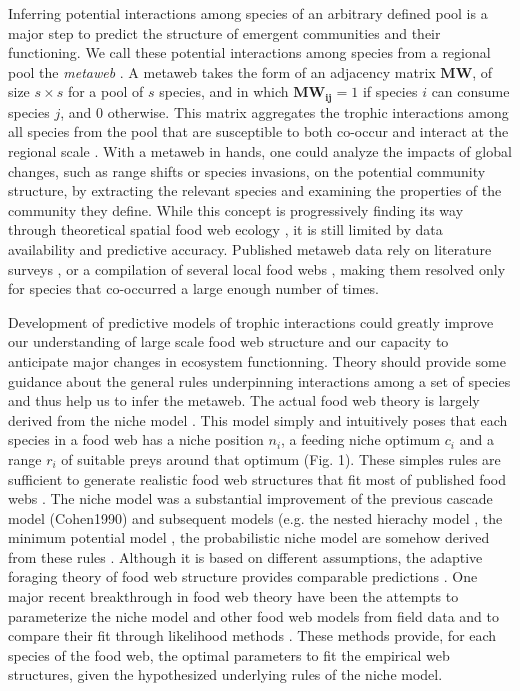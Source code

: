 \documentclass[12pt]{article}
\begin{document}
Inferring potential interactions among species of an arbitrary defined pool is a major step to predict the structure of emergent communities and their functioning. We call these potential interactions among species from a regional pool the \emph{metaweb} \parencite{Dunne2006}. A metaweb takes the form of an adjacency matrix $\mathbf{MW}$, of size $s\times s$ for a pool of $s$ species, and in which $\mathbf{MW_{ij}} = 1$ if species $i$ can consume species $j$, and $0$ otherwise. This matrix aggregates the trophic interactions among all species from the pool that are susceptible to both co-occur and interact at the regional scale \parencite{Dunne2006}. With a metaweb in hands, one could analyze the impacts of global changes, such as range shifts or species invasions, on the potential community structure, by extracting the relevant species and examining the properties of the community they define. While this concept is progressively finding its way through theoretical spatial food web ecology \parencite{Lafferty2010, Pillai2009, Gravel2011a, Gravel2011b}, it is still limited by data availability and predictive accuracy. Published metaweb data rely on literature surveys \parencite{Havens1992, Piechnik2008, Baiser2012}, or a compilation of several local food webs \parencite{Stanko2002, Poisot2012a}, making them resolved only for species that co-occurred a large enough number of times. 

Development of predictive models of trophic interactions could greatly improve our understanding of large scale food web structure and our capacity to anticipate major changes in ecosystem functionning. Theory should provide some guidance about the general rules underpinning interactions among a set of species and thus help us to infer the metaweb. The actual food web theory is largely derived from the niche model \parencite{Williams2000}. This model simply and intuitively poses that each species in a food web has a niche position $n_i$, a feeding niche optimum $c_i$ and a range $r_i$ of suitable preys around that optimum (Fig. 1). These simples rules are sufficient to generate realistic food web structures that fit most of published food webs \parencite{Dunne2006}. The niche model was a substantial improvement of the previous cascade model (Cohen1990) and subsequent models (e.g. the nested hierachy model \parencite{Cattin2004}, the minimum potential model \parencite{Allesina2008}, the probabilistic niche model \parencite{Williams2010} are somehow derived from these rules \parencite{Stouffer2005}. Although it is based on different assumptions, the adaptive foraging theory of food web structure \parencite{Petchey2008b} provides comparable predictions \parencite{Williams2010}. One major recent breakthrough in food web theory have been the attempts to parameterize the niche model and other food web models from field data and to compare their fit through likelihood methods \parencite{Allesina2008, Williams2010, Williams2011}. These methods provide, for each species of the food web, the optimal parameters to fit the empirical web structures, given the hypothesized underlying rules of the niche model. 
\end{document}
